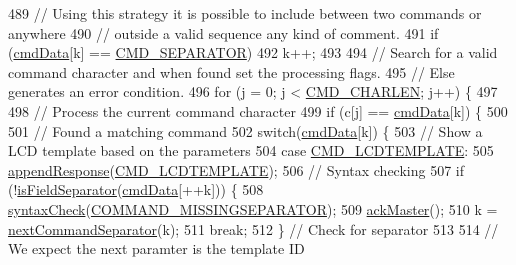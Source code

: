 \begin{DoxyCode}
489     \textcolor{comment}{// Using this strategy it is possible to include between two commands or anywhere}
490     \textcolor{comment}{// outside a valid sequence any kind of comment.}
491     \textcolor{keywordflow}{if} (\hyperlink{_meditech___chip_kit_control_panel_8pde_afd31a444e0380e6be247c64cdb1510a9}{cmdData}[k] == \hyperlink{_command_processor_8h_aa3115116a4036d93c8c91cf7e0f13c70}{CMD\_SEPARATOR})
492       k++;
493 
494     \textcolor{comment}{// Search for a valid command character and when found set the processing flags.}
495     \textcolor{comment}{// Else generates an error condition. }
496     \textcolor{keywordflow}{for} (j = 0; j < \hyperlink{_command_processor_8h_a91c8743332ff637bc271733a535f31e7}{CMD\_CHARLEN}; j++) \{
497       
498       \textcolor{comment}{// Process the current command character}
499       \textcolor{keywordflow}{if} (c[j] == \hyperlink{_meditech___chip_kit_control_panel_8pde_afd31a444e0380e6be247c64cdb1510a9}{cmdData}[k]) \{
500         
501         \textcolor{comment}{// Found a matching command}
502         \textcolor{keywordflow}{switch}(\hyperlink{_meditech___chip_kit_control_panel_8pde_afd31a444e0380e6be247c64cdb1510a9}{cmdData}[k]) \{
503           \textcolor{comment}{// Show a LCD template based on the parameters}
504           \textcolor{keywordflow}{case} \hyperlink{_command_processor_8h_acd6dc9f192384457eca2de560b24e112}{CMD\_LCDTEMPLATE}:
505             \hyperlink{_meditech___chip_kit_control_panel_8pde_afffcc2cca703b7a4d76c7f2dedd7266d}{appendResponse}(\hyperlink{_command_processor_8h_acd6dc9f192384457eca2de560b24e112}{CMD\_LCDTEMPLATE});
506             \textcolor{comment}{// Syntax checking}
507             \textcolor{keywordflow}{if} (!\hyperlink{_meditech___chip_kit_control_panel_8pde_a5e204e0bba8ab8ee2bde88215bf2ee53}{isFieldSeparator}(\hyperlink{_meditech___chip_kit_control_panel_8pde_afd31a444e0380e6be247c64cdb1510a9}{cmdData}[++k])) \{
508               \hyperlink{_meditech___chip_kit_control_panel_8pde_a586164a6eff90eab6ba87a6ca123770d}{syntaxCheck}(\hyperlink{_parser_errors_8h_af1641bf12003024ece5012a639004d5c}{COMMAND\_MISSINGSEPARATOR});
509               \hyperlink{_meditech___chip_kit_control_panel_8pde_a4e435af9ec30d668c4cff6a97baa8e5a}{ackMaster}();
510               k = \hyperlink{_meditech___chip_kit_control_panel_8pde_a4b62bbf3dd6cf7eb7fee557932fd1b7c}{nextCommandSeparator}(k);
511               \textcolor{keywordflow}{break};
512             \} \textcolor{comment}{// Check for separator}
513             
514             \textcolor{comment}{// We expect the next paramter is the template ID}

\end{DoxyCode}
